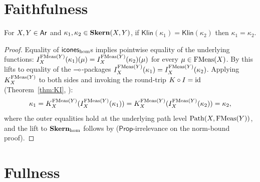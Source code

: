 \section{Faithfulness}\label{sec:skern-faithful}

\begin{theorem}%
\label{thm:thm65-faithful}\rocqok\mathcompok
{}%
For $X, Y \in \mathsf{Ar}$ and $\kappa_1, \kappa_2 \in \mathbf{Skern}(X, Y)$, if
$\mathsf{Klin}(\kappa_1) = \mathsf{Klin}(\kappa_2)$ then $\kappa_1 = \kappa_2$.
\end{theorem}
\begin{proof}
Equality of $\mathsf{icones}_{\mathrm{hom}}$s implies pointwise equality of
the underlying functions:
$I^{\mathrm{FMeas}(Y)}_X(\kappa_1)(\mu) = I^{\mathrm{FMeas}(Y)}_X(\kappa_2)(\mu)$ for
every $\mu \in \mathrm{FMeas}(X)$. By
 this lifts to equality of the
$\multimap$-packages $I^{\mathrm{FMeas}(Y)}_X(\kappa_1)
= I^{\mathrm{FMeas}(Y)}_X(\kappa_2)$. Applying $K^{\mathrm{FMeas}(Y)}_X$ to both
sides and invoking the round-trip $K \circ I = \mathrm{id}$
(Theorem~\ref{thm:KI},
):
\[
  \kappa_1
   = K^{\mathrm{FMeas}(Y)}_X(I^{\mathrm{FMeas}(Y)}_X(\kappa_1))
   = K^{\mathrm{FMeas}(Y)}_X(I^{\mathrm{FMeas}(Y)}_X(\kappa_2))
   = \kappa_2,
\]
where the outer equalities hold at the underlying path level
$\mathrm{Path}(X, \mathrm{FMeas}(Y))$, and the lift to $\mathbf{Skern}_{\mathrm{hom}}$
follows by 
($\mathsf{Prop}$-irrelevance on the norm-bound proof).
\end{proof}

\section{Fullness}\label{sec:skern-full}

